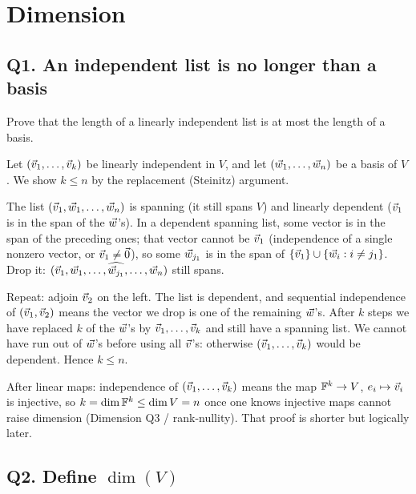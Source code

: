 \section{Dimension}

\subsection{Q1. An independent list is no longer than a basis}

\begin{promptbox}
Prove that the length of a linearly independent list is at most the length of a
basis.
\end{promptbox}

\begin{coursebox}
Let $(\vec{v}_1,\ldots,\vec{v}_k)$ be linearly independent in $V$, and let
$(\vec{w}_1,\ldots,\vec{w}_n)$ be a basis of $V$. We show $k\le n$ by the replacement
(Steinitz) argument.

The list $(\vec{v}_1,\vec{w}_1,\ldots,\vec{w}_n)$ is spanning (it still spans $V$) and
linearly dependent ($\vec{v}_1$ is in the span of the $\vec{w}$'s). In a dependent
spanning list, some vector is in the span of the preceding ones; that vector
cannot be $\vec{v}_1$ (independence of a single nonzero vector, or $\vec{v}_1\neq\vec{0}$),
so some $\vec{w}_{j_1}$ is in the span of $\{\vec{v}_1\}\cup\{\vec{w}_i:i\neq j_1\}$. Drop it:
$(\vec{v}_1,\vec{w}_1,\ldots,\widehat{\vec{w}_{j_1}},\ldots,\vec{w}_n)$ still spans.

Repeat: adjoin $\vec{v}_2$ on the left. The list is dependent, and sequential
independence of $(\vec{v}_1,\vec{v}_2)$ means the vector we drop is one of the remaining
$\vec{w}$'s. After $k$ steps we have replaced $k$ of the $\vec{w}$'s by $\vec{v}_1,\ldots,\vec{v}_k$
and still have a spanning list. We cannot have run out of $\vec{w}$'s before using
all $\vec{v}$'s: otherwise $(\vec{v}_1,\ldots,\vec{v}_k)$ would be dependent. Hence $k\le n$.
\end{coursebox}

\begin{laterbox}
After linear maps: independence of $(\vec{v}_1,\ldots,\vec{v}_k)$ means the map
$\mathbb{F}^k\to V$, $e_i\mapsto\vec{v}_i$ is injective, so $k=\dim\mathbb{F}^k\le\dim V=n$ once
one knows injective maps cannot raise dimension (Dimension Q3 / rank-nullity).
That proof is shorter but logically later.
\end{laterbox}

\subsection{Q2. Define $\dim(V)$}

